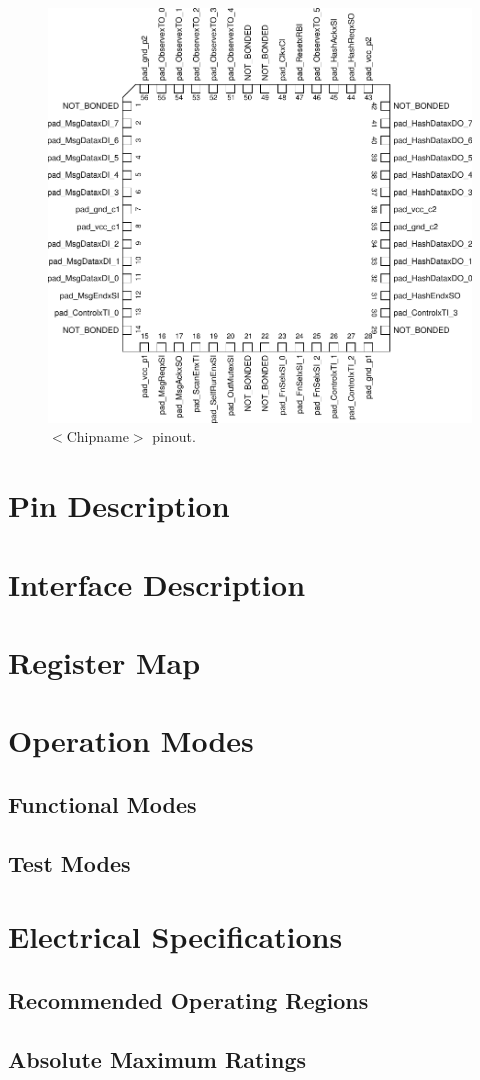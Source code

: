 \begin{figure}[htbp]
  \centering \includegraphics[width=1.0\textwidth]{./figures/asic_pinout}
  \caption{$<$Chipname$>$ pinout.}
\end{figure}

\section{Pin Description}
\lipsum[2]

\section{Interface Description}
\lipsum[2]

\section{Register Map}
\lipsum[2]

\section{Operation Modes}
\lipsum[2]

\subsection{Functional Modes}
\subsection{Test Modes}

\section{Electrical Specifications}
\lipsum[2]
\subsection{Recommended Operating Regions}
\subsection{Absolute Maximum Ratings}
